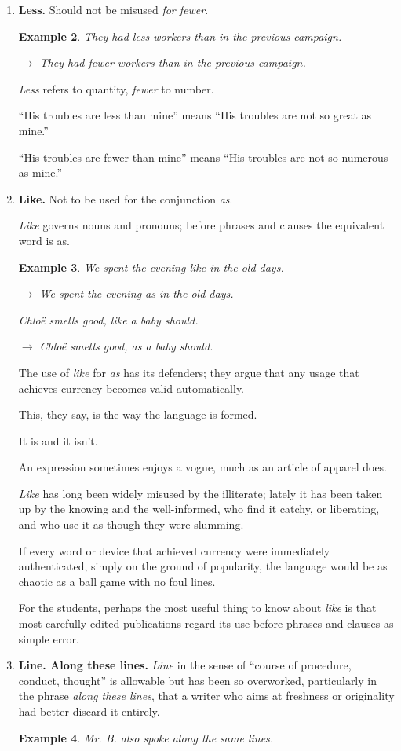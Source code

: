 \documentclass{book}
\numberwithin{equation}{section}
\newtheorem{example}{Example}[chapter]
\begin{document}
\begin{enumerate}
\begin{example}
        $\to$ Let go of that rope!
    \end{example}
    \item \textbf{Less.} Should not be misused \textit{for fewer}.
    \begin{example}
        They had less workers than in the previous campaign.
        
        $\to$ They had fewer workers than in the previous campaign.
    \end{example}
    \textit{Less} refers to quantity, \textit{fewer} to number.
    
    ``His troubles are less than mine'' means ``His troubles are not so great as mine.''
    
    ``His troubles are fewer than mine'' means ``His troubles are not so numerous as mine.''
    \item \textbf{Like.} Not to be used for the conjunction \textit{as}.
    
    \textit{Like} governs nouns and pronouns; before phrases and clauses the equivalent word is as.
    \begin{example}
        We spent the evening like in the old days.
        
        $\to$ We spent the evening as in the old days.
        
        Chlo\"e smells good, like a baby should.
        
        $\to$ Chlo\"e smells good, as a baby should.
    \end{example}
    The use of \textit{like} for \textit{as} has its defenders; they argue that any usage that achieves currency becomes valid automatically.
    
    This, they say, is the way the language is formed.
    
    It is and it isn't.
    
    An expression sometimes enjoys a vogue, much as an article of apparel does.
    
    \textit{Like} has long been widely misused by the illiterate; lately it has been taken up by the knowing and the well-informed, who find it catchy, or liberating, and who use it as though they were slumming.
    
    If every word or device that achieved currency were immediately authenticated, simply on the ground of popularity, the language would be as chaotic as a ball game with no foul lines.
    
    For the students, perhaps the most useful thing to know about \textit{like} is that most carefully edited publications regard its use before phrases and clauses as simple error.
    \item \textbf{Line. Along these lines.} \textit{Line} in the sense of ``course of procedure, conduct, thought'' is allowable but has been so overworked, particularly in the phrase \textit{along these lines}, that a writer who aims at freshness or originality had better discard it entirely.
    \begin{example}
        Mr. B. also spoke along the same lines.
        

\end{example}
\end{enumerate}
\end{document}
